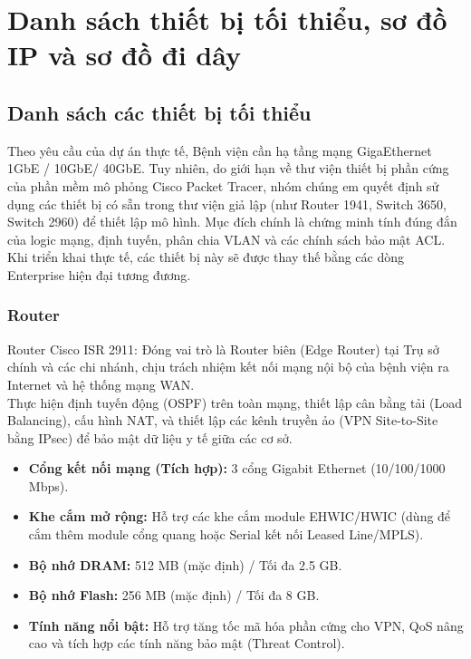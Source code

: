 
\section{Danh sách thiết bị tối thiểu, sơ đồ IP và sơ đồ đi dây}
\subsection{Danh sách các thiết bị tối thiểu}
Theo yêu cầu của dự án thực tế, Bệnh viện cần hạ tầng mạng GigaEthernet 1GbE / 10GbE/ 40GbE. Tuy nhiên, do giới hạn về thư viện thiết bị phần cứng của phần mềm mô phỏng Cisco Packet Tracer, nhóm chúng em quyết định sử dụng các thiết bị có sẵn trong thư viện giả lập (như Router 1941, Switch 3650, Switch 2960) để thiết lập mô hình. Mục đích chính là chứng minh tính đúng đắn của logic mạng, định tuyến, phân chia VLAN và các chính sách bảo mật ACL. Khi triển khai thực tế, các thiết bị này sẽ được thay thế bằng các dòng Enterprise hiện đại tương đương.
\subsubsection{Router}
Router Cisco ISR 2911: Đóng vai trò là Router biên (Edge Router) tại Trụ sở chính và các chi nhánh, chịu trách nhiệm kết nối mạng nội bộ của bệnh viện ra Internet và hệ thống mạng WAN.\\
\indent Thực hiện định tuyến động (OSPF) trên toàn mạng, thiết lập cân bằng tải (Load Balancing), cấu hình NAT, và thiết lập các kênh truyền ảo (VPN Site-to-Site bằng IPsec) để bảo mật dữ liệu y tế giữa các cơ sở.

\begin{tcolorbox}[
        enhanced,
        colback=white,
        colframe=darkgray,
        coltitle=black,
        fonttitle=\large\bfseries,
        title=Thông số kỹ thuật Router Cisco ISR 2911,
        attach boxed title to top left={xshift=5mm, yshift=-3mm},
        boxed title style={colback=white, colframe=darkgray},
        drop fuzzy shadow,
        top=4mm, bottom=2mm, left=2mm, right=2mm
    ]
        \begin{itemize}
            \item \textbf{Cổng kết nối mạng (Tích hợp):} 3 cổng Gigabit Ethernet (10/100/1000 Mbps).
            \item \textbf{Khe cắm mở rộng:} Hỗ trợ các khe cắm module EHWIC/HWIC (dùng để cắm thêm module cổng quang hoặc Serial kết nối Leased Line/MPLS).
            \item \textbf{Bộ nhớ DRAM:} 512 MB (mặc định) / Tối đa 2.5 GB.
            \item \textbf{Bộ nhớ Flash:} 256 MB (mặc định) / Tối đa 8 GB.
            \item \textbf{Tính năng nổi bật:} Hỗ trợ tăng tốc mã hóa phần cứng cho VPN, QoS nâng cao và tích hợp các tính năng bảo mật (Threat Control).
        \end{itemize}
    \end{tcolorbox}

